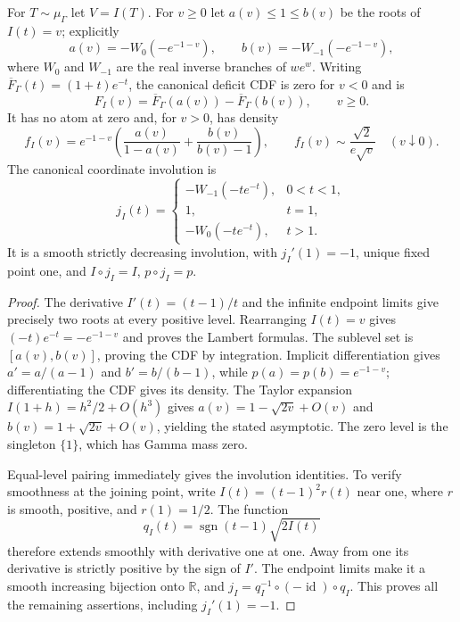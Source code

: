 \begin{proposition}
\label{final:P4-data}
For $T\sim\mu_\Gamma$ let $V=I(T)$.  For $v\geq0$ let
$a(v)\leq1\leq b(v)$ be the roots of $I(t)=v$; explicitly
\[
 a(v)=-W_0(-e^{-1-v}),\qquad
 b(v)=-W_{-1}(-e^{-1-v}),
\]
where $W_0$ and $W_{-1}$ are the real inverse branches of $w e^w$.
Writing $\overline F_\Gamma(t)=(1+t)e^{-t}$, the canonical deficit
CDF is zero for $v<0$ and is
\begin{equation}
 F_I(v)=\overline F_\Gamma(a(v))-\overline F_\Gamma(b(v)),
                \qquad v\geq0.\label{final:eq-deficit-cdf}
\end{equation}
It has no atom at zero and, for $v>0$, has density
\begin{equation}
 f_I(v)=e^{-1-v}
 \left(\frac{a(v)}{1-a(v)}+\frac{b(v)}{b(v)-1}\right),
 \qquad f_I(v)\sim\frac{\sqrt2}{e\sqrt v}\quad(v\downarrow0).
 \label{final:eq-deficit-density}
\end{equation}
The canonical coordinate involution is
\begin{equation}
 j_I(t)=
 \begin{cases}
 -W_{-1}(-te^{-t}),&0<t<1,\\
 1,&t=1,\\
 -W_0(-te^{-t}),&t>1.
 \end{cases}\label{final:eq-deficit-involution}
\end{equation}
It is a smooth strictly decreasing involution, with $j_I'(1)=-1$,
unique fixed point one, and $I\circ j_I=I$, $p\circ j_I=p$.
\end{proposition}
\begin{proof}
The derivative $I'(t)=(t-1)/t$ and the infinite endpoint limits
give precisely two roots at every positive level.  Rearranging
$I(t)=v$ gives $(-t)e^{-t}=-e^{-1-v}$ and proves the Lambert
formulas.  The sublevel set is $[a(v),b(v)]$, proving the CDF by
integration.  Implicit differentiation gives
$a'=a/(a-1)$ and $b'=b/(b-1)$, while
$p(a)=p(b)=e^{-1-v}$; differentiating the CDF gives its density.
The Taylor expansion $I(1+h)=h^2/2+O(h^3)$ gives
$a(v)=1-\sqrt{2v}+O(v)$ and
$b(v)=1+\sqrt{2v}+O(v)$, yielding the stated asymptotic.
The zero level is the singleton $\{1\}$, which has Gamma mass zero.

Equal-level pairing immediately gives the involution identities.
To verify smoothness at the joining point, write
$I(t)=(t-1)^2 r(t)$ near one, where $r$ is smooth, positive, and
$r(1)=1/2$.  The function
\[
 q_I(t)=\operatorname{sgn}(t-1)\sqrt{2I(t)}
\]
therefore extends smoothly with derivative one at one.  Away from
one its derivative is strictly positive by the sign of $I'$.
The endpoint limits make it a smooth increasing bijection onto
$\mathbb R$, and
$j_I=q_I^{-1}\circ(-\operatorname{id})\circ q_I$.
This proves all the remaining assertions, including $j_I'(1)=-1$.
\end{proof}

